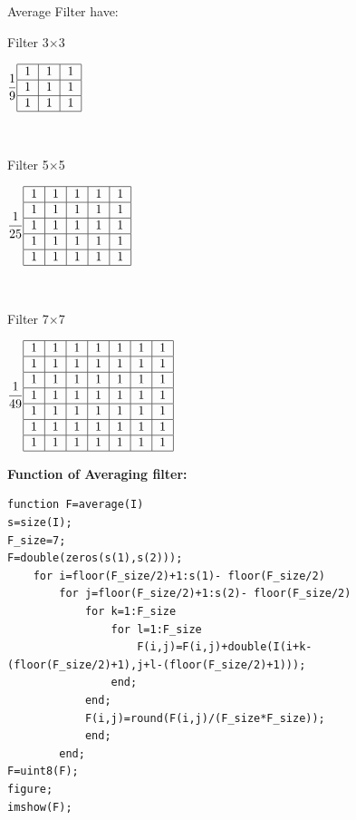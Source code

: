 \documentclass[10pt]{article}
\begin{document}
Average Filter have: 
\begin{center}
	Filter 3$\times$3

$\dfrac{1}{9}\begin{tabular}{|c|c|c|}
\hline 
1 & 1 & 1 \\ 
\hline 
1 & 1 & 1 \\ 
\hline 
1 & 1 & 1 \\ 
\hline 
\end{tabular}$ 	
\end{center}

\

\begin{center}
		Filter 5$\times$5
	
	$\dfrac{1}{25}\begin{tabular}{|c|c|c|c|c|}
		\hline 
		1 & 1 & 1 & 1 & 1 \\ 
		\hline 
		1 & 1 & 1 & 1 & 1 \\ 
		\hline 
		1 & 1 & 1 & 1 & 1 \\ 
		\hline 
		1 & 1 & 1 & 1 & 1 \\ 
		\hline 
		1 & 1 & 1 & 1 & 1 \\ 
		\hline 
	\end{tabular} $
\end{center}

\

\begin{center}
	Filter 7$\times$7

$\dfrac{1}{49}\begin{tabular}{|c|c|c|c|c|c|c|}
	\hline 
	1 & 1 & 1 & 1 & 1 & 1 & 1 \\ 
	\hline 
	1 & 1 & 1 & 1 & 1 & 1 & 1 \\ 
	\hline 
	1 & 1 & 1 & 1 & 1 & 1 & 1 \\ 
	\hline 
	1 & 1 & 1 & 1 & 1 & 1 & 1 \\ 
	\hline 
	1 & 1 & 1 & 1 & 1 & 1 & 1 \\ 
	\hline 
	1 & 1 & 1 & 1 & 1 & 1 & 1 \\ 
	\hline 
	1 & 1 & 1 & 1 & 1 & 1 & 1 \\ 
	\hline 
\end{tabular} $
\end{center}





\textbf{Function of Averaging filter:}
\begin{lstlisting}
function F=average(I)
s=size(I);
F_size=7;
F=double(zeros(s(1),s(2)));
	for i=floor(F_size/2)+1:s(1)- floor(F_size/2)
		for j=floor(F_size/2)+1:s(2)- floor(F_size/2)
			for k=1:F_size
				for l=1:F_size
					F(i,j)=F(i,j)+double(I(i+k-(floor(F_size/2)+1),j+l-(floor(F_size/2)+1)));
				end;
			end;
			F(i,j)=round(F(i,j)/(F_size*F_size));
			end;
		end;
F=uint8(F);
figure;
imshow(F);
\end{lstlisting}
\end{document}
